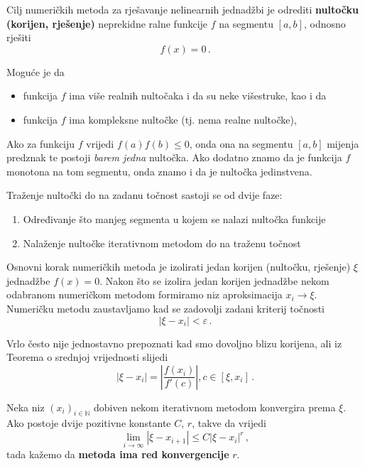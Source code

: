 Cilj numeričkih metoda za rješavanje nelinearnih jednadžbi je odrediti
\textbf{nultočku (korijen, rješenje)} neprekidne ralne funkcije $f$ na segmentu
$[a,b]$, odnosno rješiti
$$
    f(x) = 0\,.
$$

Moguće je da
\begin{itemize}
    \item funkcija $f$ ima više realnih nultočaka i da su neke višestruke, kao i
    da
    \item funkcija $f$ ima kompleksne nultočke (tj. nema realne nultočke),
\end{itemize}

Ako za funkciju $f$ vrijedi $f(a)f(b) \leq 0$, onda ona na segmentu $[a,b]$
mijenja predznak te postoji \textit{barem jedna} nultočka. Ako dodatno znamo da
je funkcija $f$ monotona na tom segmentu, onda znamo i da je nultočka
jedinstvena.

Traženje nultočki do na zadanu točnost sastoji se od dvije faze:
\begin{enumerate}
    \item Određivanje što manjeg segmenta u kojem se nalazi nultočka funkcije
    \item Nalaženje nultočke iterativnom metodom do na traženu točnost
\end{enumerate}

Osnovni korak numeričkih metoda je izolirati jedan korijen (nultočku, rješenje)
$\xi$ jednadžbe $f(x) = 0$. Nakon što se izolira jedan korijen jednadžbe nekom
odabranom numeričkom metodom formiramo niz aproksimacija $x_i \to \xi$.
Numeričku metodu zaustavljamo kad se zadovolji zadani kriterij točnosti
$$
    |\xi - x_i | < \varepsilon\,.
$$

Vrlo često nije jednostavno prepoznati kad smo dovoljno blizu korijena, ali iz
Teorema o srednjoj vrijednosti slijedi
$$
    |\xi - x_i| = \left| \frac{f(x_i)}{f'(c)} \right|, c \in [\xi, x_i]\,.
$$

\begin{definition}
    Neka niz $(x_i)_{i\in\mathbb{N}}$ dobiven nekom iterativnom metodom
    konvergira prema $\xi$. Ako postoje dvije pozitivne konstante $C$, $r$,
    takve da vrijedi
    $$
        \lim_{i\to\infty} \left|\xi-x_{i+1}\right| \leq C|\xi-x_i|^r\,,
    $$
    tada kažemo da \textbf{metoda ima red konvergencije} $r$. 
\end{definition}
